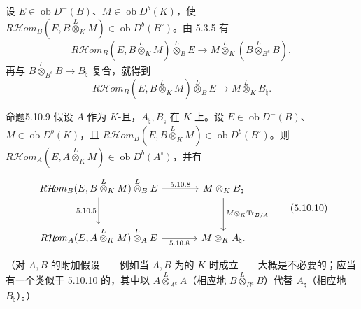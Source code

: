 设 $E\in\operatorname{ob}D^-(B)$、$M\in\operatorname{ob}D^b(K)$，使 $R\mathcal{H}\!om_B(E,B\overset L\otimes_K M)\in\operatorname{ob}D^b(B^\circ)$。由 5.3.5 有
\[R\mathcal{H}\!om_B(E,B\overset L\otimes_K M)\overset L\otimes_B E\longrightarrow M\overset L\otimes_K(B\overset L\otimes_{B^e}B),\]
再与 $B\overset L\otimes_{B^e}B\to B_\natural$ 复合，就得到
\begin{equation}R\mathcal{H}\!om_B(E,B\overset L\otimes_K M)\overset L\otimes_B E\longrightarrow M\overset L\otimes_K B_\natural.\tag{5.10.8}\end{equation}

\begin{SGAresult}{命题}{5.10.9}
假设 $A$ 作为 $K$-且，$A_\natural,B_\natural$ 在 $K$ 上。设 $E\in\operatorname{ob}D^-(B)$、$M\in\operatorname{ob}D^b(K)$，且 $R\mathcal{H}\!om_B(E,B\overset L\otimes_K M)\in\operatorname{ob}D^b(B^\circ)$。则 $R\mathcal{H}\!om_A(E,A\overset L\otimes_K M)\in\operatorname{ob}D^b(A^\circ)$，并有
\begin{equation}\begin{tikzcd}[column sep=large,row sep=large]
R\mathcal{H}\!om_B(E,B\overset L\otimes_K M)\overset L\otimes_B E\arrow[r,"5.10.8"]\arrow[d,"5.10.5"'] & M\otimes_K B_\natural\arrow[d,"M\otimes_K\operatorname{Tr}_{B/A}"]\\
R\mathcal{H}\!om_A(E,A\overset L\otimes_K M)\overset L\otimes_A E\arrow[r,"5.10.8"'] & M\otimes_K A_\natural.
\end{tikzcd}\tag{5.10.10}\end{equation}
\end{SGAresult}
（对 $A,B$ 的附加假设——例如当 $A,B$ 为的 $K$-时成立——大概是不必要的；应当有一个类似于 5.10.10 的，其中以 $A\overset L\otimes_{A^e}A$（相应地 $B\overset L\otimes_{B^e}B$）代替 $A_\natural$（相应地 $B_\natural$）。）
